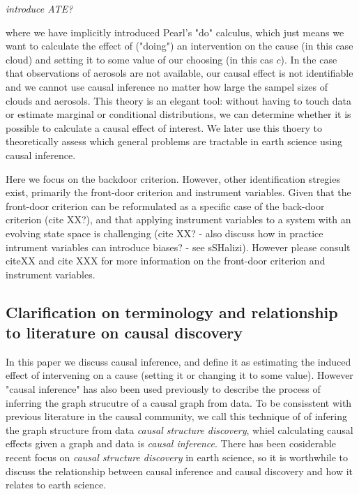 \documentclass[12pt]{article}
\begin{document}
\emph{introduce ATE?}

where we have implicitly introduced Pearl's "do" calculus, which
just means we want to calculate the effect of ("doing") an
intervention on the cause (in this case cloud) and setting it to
some value of our choosing (in this cas \(c\)). In the case that
observations of aerosols are not available, our causal effect is
not identifiable and we cannot use causal inference no matter how
large the sampel sizes of clouds and aerosols. This theory is an
elegant tool: without having to touch data or estimate marginal or
conditional distributions, we can determine whether it is possible
to calculate a causal effect of interest. We later use this thoery
to theoretically assess which general problems are tractable in
earth science using causal inference.


Here we focus on the backdoor criterion. However, other
identification stregies exist, primarily the front-door criterion
and instrument variables. Given that the front-door criterion can
be reformulated as a specific case of the back-door criterion
(cite XX?), and that applying instrument variables to a system
with an evolving state space is challenging (cite XX? - also
discuss how in practice intrument variables can introduce
biases? - see sSHalizi). However please consult citeXX and cite
XXX for more information on the front-door criterion and
instrument variables.

\subsection{Clarification on terminology and relationship to literature on causal discovery}


In this paper we discuss causal inference, and define it as
estimating the induced effect of intervening on a cause (setting
it or changing it to some value). However "causal inference" has
also been used previously to describe the process of inferring the
graph strucutre of a causal graph from data. To be consisstent
with previous literature in the causal community, we call this
technique of of infering the graph structure from data \emph{causal
structure discovery}, whiel calculating causal effects given a
graph and data is \emph{causal inference}. There has been cosiderable
recent focus on \emph{causal structure discovery} in earth science, so
it is worthwhile to discuss the relationship between causal
inference and causal discovery and how it relates to earth science.
\end{document}

